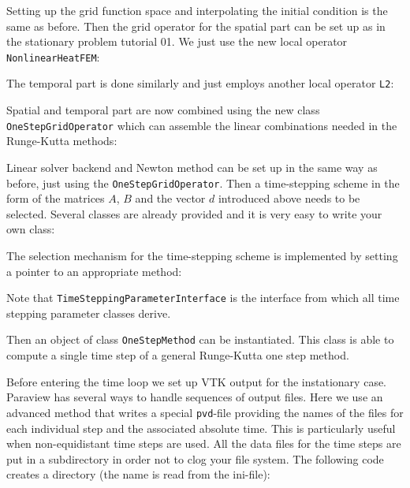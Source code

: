 \documentclass[a4paper,12pt]{article}
\begin{document}
Setting up the grid function space and interpolating the initial condition
is the same as before. Then the grid operator for the spatial part can be
set up as in the stationary problem tutorial 01. We just use the new
local operator \lstinline{NonlinearHeatFEM}:


The temporal part is done similarly and just employs another local operator
\lstinline{L2}:


Spatial and temporal part are now combined using the
new class \lstinline{OneStepGridOperator} which can assemble
the linear combinations needed in the Runge-Kutta methods:


Linear solver backend and Newton method can be set up
in the same way as before, just using the \lstinline{OneStepGridOperator}.
Then a time-stepping scheme in the form of
the matrices $A$, $B$ and the vector $d$ introduced above needs to be selected.
Several classes are already provided and it is very easy to write your own class:


The selection mechanism for the time-stepping scheme
is implemented by setting a pointer to an appropriate method:

Note that \lstinline{TimeSteppingParameterInterface} is the interface from
which all time stepping parameter classes derive.

Then an object of class \lstinline{OneStepMethod} can be instantiated.
This class is able to compute a single time step of a general
Runge-Kutta one step method.


Before entering the time loop we set up VTK output for the instationary case.
Paraview has several ways to handle sequences of output files. Here we use
an advanced method that writes a special \lstinline{pvd}-file providing the
names of the files for each individual step and the associated absolute time. This
is particularly useful when non-equidistant time steps are used. All the
data files for the time steps are put in a subdirectory in order not to clog your file system.
The following code creates a directory (the name is read from the ini-file):

\end{document}
